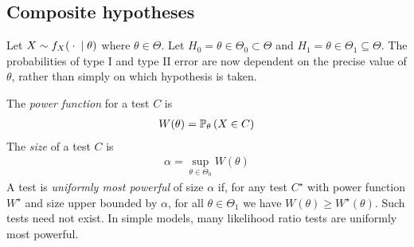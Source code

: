 \subsection{Composite hypotheses}
Let $X \sim f_X({}\cdot{} \mid \theta)$ where $\theta \in \Theta$.
Let $H_0 = \theta \in \Theta_0 \subset \Theta$ and $H_1 = \theta \in \Theta_1 \subseteq \Theta$.
The probabilities of type I and type II error are now dependent on the precise value of $\theta$, rather than simply on which hypothesis is taken.
\begin{definition}
	The \textit{power function} for a test $C$ is
	\begin{align*}
		W(\theta) = \mathbb{P}_{\theta}\left({X \in C}\right)
	\end{align*}
	The \textit{size} of a test $C$ is
	\begin{align*}
		\alpha = \sup_{\theta \in \Theta_0} W(\theta)
	\end{align*}
	A test is \textit{uniformly most powerful} of size $\alpha$ if, for any test $C^\star$ with power function $W^\star$ and size upper bounded by $\alpha$, for all $\theta \in \Theta_1$ we have $W(\theta) \geq W^\star(\theta)$.
	Such tests need not exist.
	In simple models, many likelihood ratio tests are uniformly most powerful.
\end{definition}
